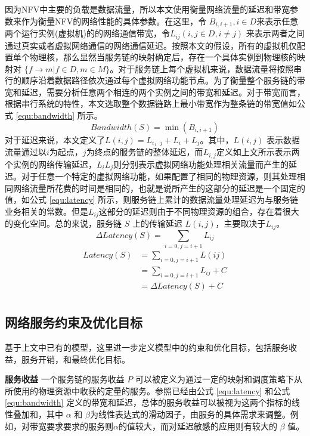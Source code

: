 因为NFV中主要的负载是数据流量，所以本文使用衡量网络流量的延迟和带宽参数来作为衡量NFV的网络性能的具体参数。在这里，令 $B_{i,i+1}, i \in D$来表示任意两个运行实例(虚拟机)的的网络通信带宽，令$L_{ij}(i,j \in D ,i \neq j)$ 来表示两者之间通过真实或者虚拟网络通信的网络通信延迟。按照本文的假设，所有的虚拟机仅配置单个物理核，那么显然当服务链的映射确定后，存在一个具体实例到物理核的映射对 $\{ f \to m | f \in D, m \in M\}$。对于服务链上每个虚拟机来说，数据流量将按照串行的顺序沿着数据路径依次通过每个虚拟网络功能节点。为了衡量整个服务链的带宽和延迟，需要分析任意两个相连的两个实例之间的带宽和延迟。对于带宽而言，根据串行系统的特性，本文选取整个数据链路上最小带宽作为整条链的带宽值如公式 \ref{equ:bandwidth} 所示。
\begin{equation}
\label{equ:bandwidth}
Bandwidth(S) = \min{(B_{i,i+1 } )}  
\end{equation}
对于延迟来说，本文定义了$L(i,j) = L_{i，j} + L_{i} + L_{j}$。其中，$L(i,j)$ 表示数据流量通过以$i$为起点，$j$为终点的服务链的整体延迟，而$L_{i,j}$定义如上文所示表示两个实例的网络传输延迟，$L_{i}$$L_{j}$则分别表示虚拟网络功能处理相关流量而产生的延迟。对于任意一个特定的虚拟网络功能，如果配置了相同的物理资源，则其处理相同网络流量所花费的时间是相同的，也就是说所产生的这部分的延迟是一个固定的值，如公式 \ref{equ:latency} 所示，则服务链上累计的数据流量处理延迟为与服务链业务相关的常数。但是$L_{ij}$这部分的延迟则由于不同物理资源的组合，存在着很大的变化空间。总的来说，服务链 $S$ 上的传输延迟 $L(i,j)$，主要取决于$L_{ij}$。
\begin{equation}
\Delta Latency(S) = \sum_{i=0,j=i+1}{L_{ij}} 
\end{equation}
\begin{equation}
\label{equ:latency}
\begin{aligned}
Latency(S) & = \sum_{i=0,j=i+1}{L(ij)} \\
& = \sum_{i=0,j=i+1}{L_{ij}}  + C \\
& = \Delta Latency(S) + C  		  \\ 
\end{aligned}
\end{equation}

\subsection{网络服务约束及优化目标}
基于上文中已有的模型，这里进一步定义模型中的约束和优化目标，包括服务收益，服务开销，和最终优化目标。

\textbf{服务收益}{ }一个服务链的服务收益 $P$ 可以被定义为通过一定的映射和调度策略下从所使用的物理资源中收获的定量的服务。参照已经由公式 \ref{equ:latency} 和公式\ref{equ:bandwidth} 定义的带宽和延迟，总体的服务收益可以被视为这两个指标的线性叠加和，其中 $\alpha$ 和 $\beta$为线性表达式的滑动因子，由服务的具体需求来调整。例如，对带宽要求要求的服务则$\alpha$的值较大，而对延迟敏感的应用则有较大的 $\beta$ 值。

